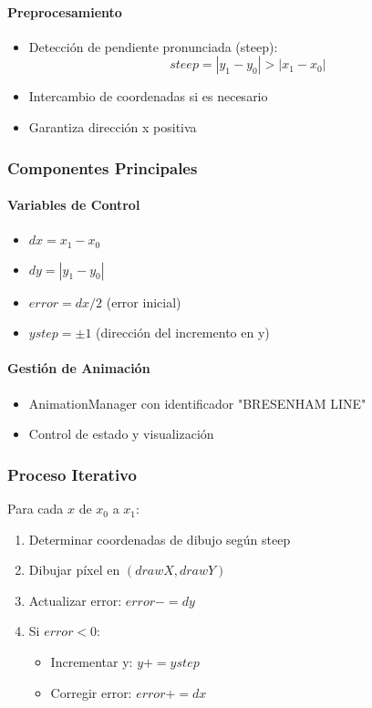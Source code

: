 \documentclass[12pt]{article}
\begin{document}
\paragraph{Preprocesamiento}
\begin{itemize}
    \item Detección de pendiente pronunciada (steep):
    \begin{equation}
        steep = |y_1 - y_0| > |x_1 - x_0|
    \end{equation}
    \item Intercambio de coordenadas si es necesario
    \item Garantiza dirección x positiva
\end{itemize}

\subsubsection{Componentes Principales}
\paragraph{Variables de Control}
\begin{itemize}
    \item $dx = x_1 - x_0$
    \item $dy = |y_1 - y_0|$
    \item $error = dx/2$ (error inicial)
    \item $ystep = \pm1$ (dirección del incremento en y)
\end{itemize}

\paragraph{Gestión de Animación}
\begin{itemize}
    \item AnimationManager con identificador "BRESENHAM LINE"
    \item Control de estado y visualización
\end{itemize}

\subsubsection{Proceso Iterativo}
Para cada $x$ de $x_0$ a $x_1$:
\begin{enumerate}
    \item Determinar coordenadas de dibujo según steep
    \item Dibujar píxel en $(drawX, drawY)$
    \item Actualizar error: $error -= dy$
    \item Si $error < 0$:
    \begin{itemize}
        \item Incrementar y: $y += ystep$
        \item Corregir error: $error += dx$
    \end{itemize}
\end{enumerate}
\end{document}
